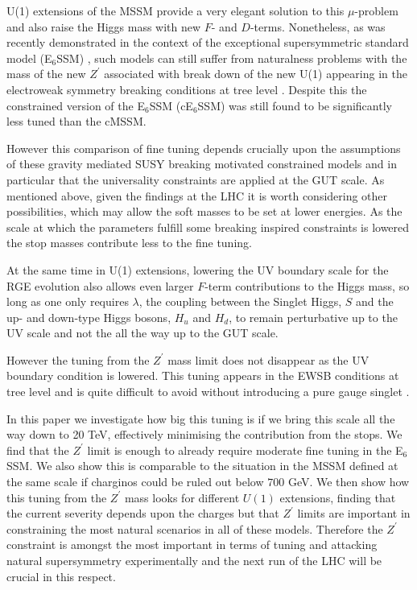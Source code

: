 \documentclass[preprint,amsmath,amssymb,aps,superscriptaddress,prd,showpacs,floatfix,nofootinbib]{revtex4-1}
\begin{document}
U(1) extensions of the MSSM provide a very elegant solution to this
$\mu$-problem \cite{Fayet:1977yc, Kim:1983dt, Suematsu:1994qm,
  Cvetic:1995rj, Cvetic:1996mf, Jain:1995cb, Nir:1995bu,
  Cvetic:1997ky} and also raise the Higgs mass with new $F$- and
$D$-terms. Nonetheless, as was recently demonstrated in the context of
the exceptional supersymmetric standard model (E$_6$SSM)
\cite{King:2005jy,King:2005my,Athron:2010zz}, such models can still
suffer from naturalness problems with the mass of the new $Z^\prime$
associated with break down of the new U(1) appearing in the
electroweak symmetry breaking conditions at tree level
\cite{Athron:2013ipa}. Despite this the constrained version of
the E$_6$SSM (cE$_6$SSM) \cite{Athron:2009ue, Athron:2009bs} was still found
to be significantly less tuned than the cMSSM.

However this comparison of fine tuning depends crucially upon the
assumptions of these gravity mediated SUSY breaking motivated
constrained models and in particular that the universality
constraints are applied at the GUT scale.  As mentioned above, given
the findings at the LHC it is worth considering other possibilities,
which may allow the soft masses to be set at lower energies. As the
scale at which the parameters fulfill some breaking inspired
constraints is lowered the stop masses contribute less to the fine
tuning.

At the same time in U(1) extensions, lowering the UV boundary scale
for the RGE evolution also allows even larger $F$-term contributions
to the Higgs mass, so long as one only requires $\lambda$, the
coupling between the Singlet Higgs, $S$ and the up- and down-type
Higgs bosons, $H_u$ and $H_d$, to remain perturbative up to the UV
scale and not the all the way up to the GUT scale.

However the tuning from the $Z^\prime$ mass limit does not disappear
as the UV boundary condition is lowered. This tuning appears in the
EWSB conditions at tree level and is quite difficult to avoid without
introducing a pure gauge singlet \cite{Athron:2014pua}.



In this paper we investigate how big this tuning is if we bring this
scale all the way down to 20 TeV, effectively minimising the contribution
from the stops. We find that the $Z^\prime$ limit is enough to already
require moderate fine tuning in the E$_6$SSM.  We also show this is
comparable to the situation in the MSSM defined at the same scale if
charginos could be ruled out below $700$ GeV.  We then show how this
tuning from the $Z^\prime$ mass looks for different $U(1)$ extensions,
finding that the current severity depends upon the charges but that
$Z^\prime$ limits are important in constraining the most natural
scenarios in all of these models.  Therefore the $Z^\prime$ constraint
is amongst the most important in terms of tuning and attacking natural
supersymmetry experimentally and the next run of the LHC will be
crucial in this respect.
\end{document}
